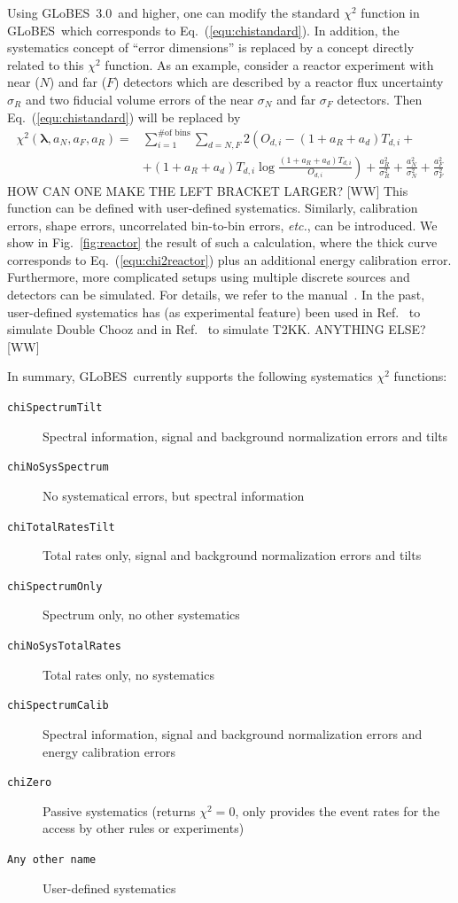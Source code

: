 \documentclass[12pt,a4paper]{article}
\newcommand{\etc}{{\it etc.}}
\newcommand{\eq}{Eq.}
\newcommand{\fig}{Fig.}
\newcommand{\Ref}{Ref.}
\newcommand{\GLOBES}{{\sf GLoBES}}
\newcommand{\GLOBESN}{{\sf GLoBES~3.0}}
\newcommand{\equ}[1]{\eq~(\ref{equ:#1})}
\newcommand{\figu}[1]{\fig~\ref{fig:#1}}
\begin{document}
Using \GLOBESN\ and higher, one can modify the standard $\chi^2$ function in
\GLOBES\ which corresponds to \equ{chistandard}. In addition, the systematics
concept of ``error dimensions'' is replaced by a concept directly related to
this $\chi^2$ function. As an example, consider a reactor experiment with near ($N$)
and far ($F$) detectors which are described by a reactor flux uncertainty $\sigma_R$
and two fiducial volume errors of the near $\sigma_N$ and far $\sigma_F$ detectors.
Then \equ{chistandard} will be replaced by
\begin{align}
  \chi^2(\boldsymbol{\lambda},a_N,a_F,a_R) = & \sum_{i=1}^{\textrm{\# of bins}} \sum_{d = N,F} 2
     \left( O_{d,i} - (1 + a_R + a_d) T_{d,i} + \right. \nonumber \\
& \left. + (1 + a_R + a_d) T_{d,i} \log \frac{(1 + a_R + a_d) T_{d,i}}{O_{d,i}}  \right) 
          + \frac{a_R^2}{\sigma_R^2} + \frac{a_N^2}{\sigma_N^2} + \frac{a_F^2}{\sigma_F^2}
\label{equ:chi2reactor}
\end{align}
HOW CAN ONE MAKE THE LEFT BRACKET LARGER? [WW]
This function can be defined with user-defined systematics. Similarly, calibration errors, shape
errors, uncorrelated bin-to-bin errors, \etc , can be introduced. We show in \figu{reactor} the result of
such a calculation, where the thick curve corresponds to \equ{chi2reactor} plus an additional 
energy calibration error.
Furthermore, more complicated setups using multiple discrete sources and detectors can be simulated. For details, we refer to the manual~\cite{Manual}.
In the past, user-defined systematics has (as experimental feature) been used in \Ref~\cite{Huber:2006vr} to
simulate Double Chooz and in \Ref~\cite{Barger:2006kp} to simulate T2KK. ANYTHING ELSE? [WW]

In summary, \GLOBES\ currently supports the following systematics $\chi^2$ functions:
\begin{description}
\item[{\tt chiSpectrumTilt}]
 Spectral information, signal and background normalization errors and tilts 
\item[{\tt chiNoSysSpectrum}]
 No systematical errors, but spectral information
\item[{\tt chiTotalRatesTilt}]
 Total rates only, signal and background normalization errors and tilts 
\item[{\tt chiSpectrumOnly}]
 Spectrum only, no other systematics 
\item[{\tt chiNoSysTotalRates}]
 Total rates only, no systematics
\item[{\tt chiSpectrumCalib}]
 Spectral information, signal and background normalization errors and energy calibration errors 
\item[{\tt chiZero}]
 Passive systematics (returns $\chi^2=0$, only provides the event rates for the access by other
rules or experiments)
\item[{\tt Any other name}]
 User-defined systematics
\end{description}
\end{document}

